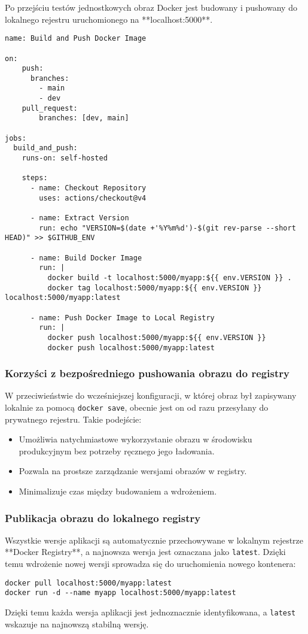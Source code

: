 Po przejściu testów jednostkowych obraz Docker jest budowany i pushowany do lokalnego rejestru uruchomionego na **localhost:5000**.

\begin{verbatim}
name: Build and Push Docker Image

on:
    push:
      branches:
        - main
        - dev
    pull_request:
        branches: [dev, main]

jobs:
  build_and_push:
    runs-on: self-hosted

    steps:
      - name: Checkout Repository
        uses: actions/checkout@v4

      - name: Extract Version
        run: echo "VERSION=$(date +'%Y%m%d')-$(git rev-parse --short HEAD)" >> $GITHUB_ENV

      - name: Build Docker Image
        run: |
          docker build -t localhost:5000/myapp:${{ env.VERSION }} .
          docker tag localhost:5000/myapp:${{ env.VERSION }} localhost:5000/myapp:latest

      - name: Push Docker Image to Local Registry
        run: |
          docker push localhost:5000/myapp:${{ env.VERSION }}
          docker push localhost:5000/myapp:latest
\end{verbatim}

\subsubsection{Korzyści z bezpośredniego pushowania obrazu do registry}

W przeciwieństwie do wcześniejszej konfiguracji, w której obraz był zapisywany lokalnie za pomocą \texttt{docker save}, obecnie jest on od razu przesyłany do prywatnego rejestru. Takie podejście:
\begin{itemize}
    \item Umożliwia natychmiastowe wykorzystanie obrazu w środowisku produkcyjnym bez potrzeby ręcznego jego ładowania.
    \item Pozwala na prostsze zarządzanie wersjami obrazów w registry.
    \item Minimalizuje czas między budowaniem a wdrożeniem.
\end{itemize}

\subsubsection{Publikacja obrazu do lokalnego registry}

Wszystkie wersje aplikacji są automatycznie przechowywane w lokalnym rejestrze **Docker Registry**, a najnowsza wersja jest oznaczana jako \texttt{latest}. Dzięki temu wdrożenie nowej wersji sprowadza się do uruchomienia nowego kontenera:

\begin{verbatim}
docker pull localhost:5000/myapp:latest
docker run -d --name myapp localhost:5000/myapp:latest
\end{verbatim}

Dzięki temu każda wersja aplikacji jest jednoznacznie identyfikowana, a \texttt{latest} wskazuje na najnowszą stabilną wersję.